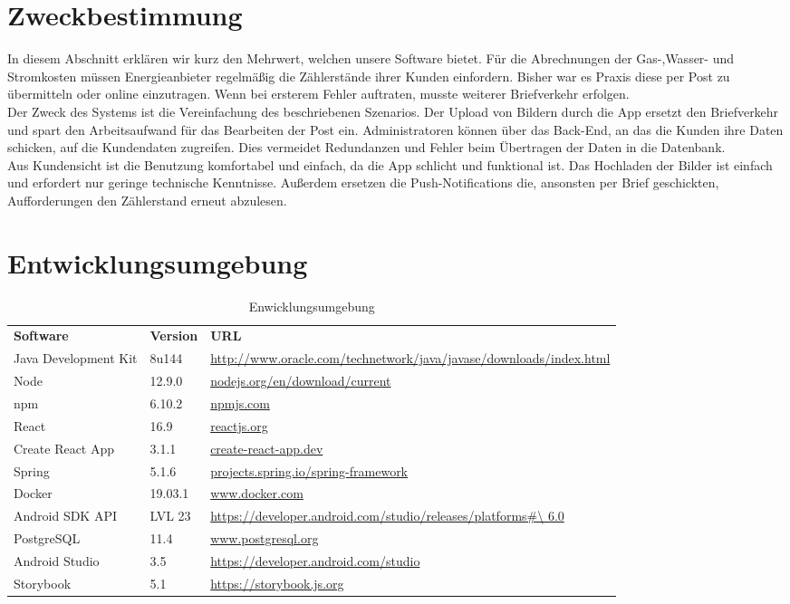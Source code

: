 \section{Zweckbestimmung}\label{sec:zweckbestimmung}
In diesem Abschnitt erklären wir kurz den Mehrwert, welchen unsere Software bietet. 
Für die Abrechnungen der Gas-,Wasser- und Stromkosten müssen Energieanbieter regelmäßig die Zählerstände ihrer
Kunden einfordern. Bisher war es Praxis diese per Post zu übermitteln oder online einzutragen. Wenn bei ersterem Fehler auftraten, musste weiterer Briefverkehr erfolgen.\\
Der Zweck des Systems ist die Vereinfachung des beschriebenen Szenarios. Der Upload von Bildern durch die App ersetzt den Briefverkehr und spart den Arbeitsaufwand für das Bearbeiten der Post ein. Administratoren können über das Back-End, an das die Kunden ihre Daten schicken, auf die Kundendaten zugreifen. Dies vermeidet Redundanzen und Fehler beim Übertragen der Daten in die Datenbank.\\
Aus Kundensicht ist die Benutzung komfortabel und einfach, da die App schlicht und funktional ist. Das Hochladen der Bilder ist einfach und erfordert nur geringe technische Kenntnisse. Außerdem ersetzen die Push-Notifications die, ansonsten per Brief geschickten, Aufforderungen den Zählerstand erneut abzulesen.


\section{Entwicklungsumgebung}\label{sec:entwicklungsumgebung}

\begin{table}[h]
	\centering
	\begin{tabularx}{\textwidth}{l l X}
		\rowcolor[HTML]{C0C0C0} 
		\textbf{Software} & \textbf{Version} & \textbf{URL} \\
		Java Development Kit & 8u144 & \url{http://www.oracle.com/technetwork/java/javase/downloads/index.html} \\
		\rowcolor[HTML]{E7E7E7} 
		Node & 12.9.0 & \url{nodejs.org/en/download/current} \\
		npm & 6.10.2 & \url{npmjs.com} \\
		\rowcolor[HTML]{E7E7E7} 
		React &16.9 &\url{reactjs.org}\\
		Create React App & 3.1.1 & \url{create-react-app.dev} \\
		\rowcolor[HTML]{E7E7E7} 
		Spring & 5.1.6 & \url{projects.spring.io/spring-framework} \\
		Docker & 19.03.1& \url{www.docker.com} \\
		\rowcolor[HTML]{E7E7E7} 
		Android SDK API&LVL 23 & \url {https://developer.android.com/studio/releases/platforms\#\ 6.0} \\
		PostgreSQL &11.4 & \url{www.postgresql.org} \\
		\rowcolor[HTML]{E7E7E7}
		Android Studio & 3.5 & \url{https://developer.android.com/studio} \\
		Storybook & 5.1 &\url {https://storybook.js.org} \\
	\end{tabularx}
	\caption{Enwicklungsumgebung}
	\label{table:entwicklungsumgebung}
\end{table}